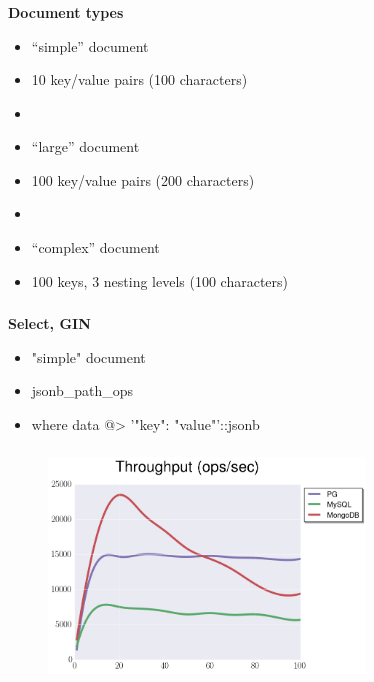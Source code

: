 \documentclass[usenames,dvipsnames, 18pt, compress, aspectratio=169]{beamer}
\begin{document}
\begin{frame}
    \frametitle{}
    \begin{center}
        \textbf{Document types}
        \begin{itemize}[label={}]
            \item “simple” document
            \item 10 key/value pairs (100 characters)
            \item
            \item “large” document
            \item 100 key/value pairs (200 characters)
            \item
            \item “complex” document
            \item 100 keys, 3 nesting levels (100 characters)
        \end{itemize}
    \end{center}
\end{frame}

\begin{frame}
    \frametitle{}
    \begin{center}
        \textbf{Select, GIN}
        \begin{itemize}[label={}]
            \item "simple" document
            \item jsonb\_path\_ops
            \item where data @> '{"key": "value"}'::jsonb
        \end{itemize}
    \end{center}
\end{frame}

\begin{frame}
    \frametitle{}
    \begin{center}
    \begin{figure}
        \includegraphics[width=0.75\textwidth,center]{benchmarks/select_jsonb_path_ops_throughput.png}
    \end{figure}
    \end{center}
\end{frame}
\end{document}
